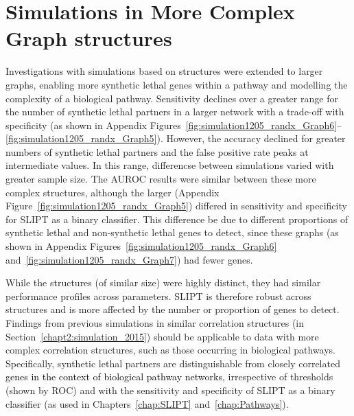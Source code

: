 \section{Simulations in More Complex Graph structures}
\label{chapt5:complex_graphs}
Investigations with simulations based on  structures were extended to larger \glspl{graph}, enabling more synthetic lethal genes within a pathway and modelling the complexity of a biological pathway. Sensitivity declines over a greater range for the number of \gls{synthetic lethal} partners in a larger network with a trade-off with specificity (as shown in Appendix Figures~\ref{fig:simulation1205_randx_Graph6}\nobreakdash--\ref{fig:simulation1205_randx_Graph5}). However, the accuracy declined for greater numbers of \gls{synthetic lethal} partners and the false positive rate peaks at intermediate values. In this range, differencse between simulations varied with greater sample size. The \gls{AUROC} results were similar between these more complex  structures, although the larger  (Appendix Figure~\ref{fig:simulation1205_randx_Graph5}) differed in sensitivity and specificity for \gls{SLIPT} as a binary classifier. This difference be due to different proportions of \gls{synthetic lethal} and non-synthetic lethal genes to detect, since these \glspl{graph} (as shown in Appendix Figures~\ref{fig:simulation1205_randx_Graph6} and~\ref{fig:simulation1205_randx_Graph7}) had fewer genes. %

While the  structures (of similar size) were highly distinct, they had similar performance profiles across parameters. \gls{SLIPT} is therefore robust across  structures and is more affected by the number or proportion of genes to detect. Findings from previous simulations in similar correlation structures (in Section~\ref{chapt2:simulation_2015}) should be applicable to  data with more complex correlation structures, such as those occurring in biological pathways. Specifically, \gls{synthetic lethal} partners are distinguishable from closely correlated \textcolor{black}{genes in the context of biological pathway networks}, irrespective of thresholds (shown by \gls{ROC}) and with the sensitivity and specificity of \gls{SLIPT} as a binary classifier (as used in Chapters~\ref{chap:SLIPT} and~\ref{chap:Pathways}).


